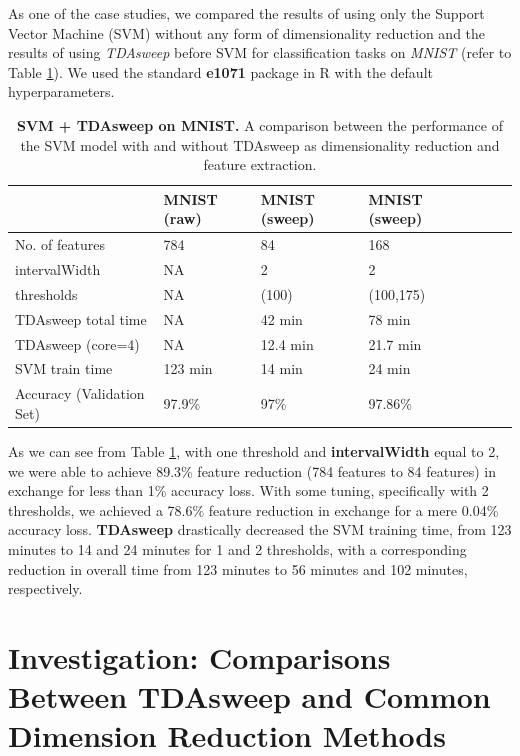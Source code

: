 \documentclass{article}
\begin{document}
As one of the case studies, we compared the results of using only the Support Vector Machine (SVM) without any form of dimensionality reduction and the results of using \emph{TDAsweep} before SVM for classification tasks on \emph{MNIST} (refer to Table \ref{mnist}). We used the standard \textbf{e1071} package in R with the default hyperparameters.

\begin{table}[!ht]
\centering
\caption{{\bf SVM + TDAsweep on MNIST.} A comparison between the performance of the SVM model with and without TDAsweep as dimensionality reduction and feature extraction.\label{mnist}}
\begin{tabular}{|l|l|l|l|l|l|l|}
\hline
\multicolumn{1}{|l|}{} & \multicolumn{1}{|l|}{\bf MNIST (raw)} & \multicolumn{1}{|l|}{\bf MNIST (sweep)} & \multicolumn{1}{|l|}{\bf MNIST (sweep)}\\ \hline
No. of features & 784 & 84 & 168  \\ \hline
intervalWidth & NA & 2 & 2  \\ \hline
thresholds & NA & (100) & (100,175)  \\ \hline
TDAsweep total time & NA & 42 min & 78 min  \\ \hline
TDAsweep (core=4) & NA & 12.4 min & 21.7 min  \\ \hline
SVM train time & 123 min & 14 min & 24 min  \\ \hline
Accuracy (Validation Set) & 97.9\% & 97\% & 97.86\% \\ \hline
\end{tabular}
\label{mnist}
\end{table}

As we can see from Table \ref{mnist}, with one threshold and \textbf{intervalWidth} equal to 2, we were able to achieve 89.3\% feature reduction (784 features to 84 features) in exchange for less than 1\% accuracy loss. With some tuning, specifically with 2 thresholds, we achieved a 78.6\% feature reduction in exchange for a mere 0.04\% accuracy loss. \textbf{TDAsweep} drastically decreased the SVM training time, from 123 minutes to 14 and 24 minutes for 1 and 2 thresholds, with a corresponding reduction in overall time from 123 minutes to 56 minutes and 102 minutes, respectively.

\section{Investigation: Comparisons Between TDAsweep and Common Dimension Reduction Methods}
\end{document}

